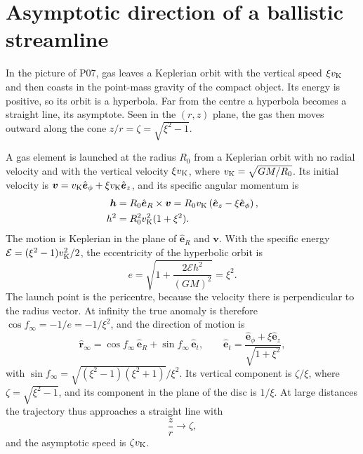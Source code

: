 
\section{Asymptotic direction of a ballistic streamline}
\label{app:ballistic}
In the picture of P07, gas leaves a Keplerian orbit with the vertical speed $\xi v_{\rm K}$ and then coasts in the point-mass gravity of the compact object.
Its energy is positive, so its orbit is a hyperbola.
Far from the centre a hyperbola becomes a straight line, its asymptote.
Seen in the $(r, z)$ plane, the gas then moves outward along the cone $z/r = \zeta = \sqrt{\xi^2 - 1}$.

A gas element is launched at the radius $R_0$ from a Keplerian orbit with no radial velocity and with the vertical velocity $\xi v_{\rm K}$, where $v_{\rm K} = \sqrt{GM/R_0}$.
Its initial velocity is $\boldsymbol v = v_{\rm K}\hat{\boldsymbol e}_\phi + \xi v_{\rm K}\hat{\boldsymbol e}_z$, and its specific angular momentum is
\begin{equation}
\begin{split}
\boldsymbol h &= R_0\hat{\boldsymbol e}_R \times \boldsymbol v = R_0v_{\rm K}\left(\hat{\boldsymbol e}_z - \xi\hat{\boldsymbol e}_\phi\right), \\
h^2 &= R_0^2v_{\rm K}^2(1 + \xi^2) .
\end{split}
\label{eq:app_h}
\end{equation}
The motion is Keplerian in the plane of $\hat{\boldsymbol e}_R$ and $\boldsymbol v$.
With the specific energy $\mathcal{E} = (\xi^2 - 1)v_{\rm K}^2/2$, the eccentricity of the hyperbolic orbit is
\begin{equation}
e = \sqrt{1 + \frac{2\mathcal{E}h^2}{(GM)^2}} = \xi^2 .
\label{eq:app_e}
\end{equation}
The launch point is the pericentre, because the velocity there is perpendicular to the radius vector.
At infinity the true anomaly is therefore $\cos f_\infty = -1/e = -1/\xi^2$, and the direction of motion is
\begin{equation}
\hat{\boldsymbol r}_\infty = \cos f_\infty\,\hat{\boldsymbol e}_R + \sin f_\infty\,\hat{\boldsymbol e}_t ,
\qquad
\hat{\boldsymbol e}_t = \frac{\hat{\boldsymbol e}_\phi + \xi\hat{\boldsymbol e}_z}{\sqrt{1 + \xi^2}} ,
\label{eq:app_rinf}
\end{equation}
with $\sin f_\infty = \sqrt{(\xi^2 - 1)(\xi^2 + 1)}/\xi^2$.
Its vertical component is $\zeta/\xi$, where $\zeta = \sqrt{\xi^2 - 1}$, and its component in the plane of the disc is $1/\xi$.
At large distances the trajectory thus approaches a straight line with
\begin{equation}
\frac{z}{r} \to \zeta ,
\label{eq:app_asym}
\end{equation}
and the asymptotic speed is $\zeta v_{\rm K}$.
